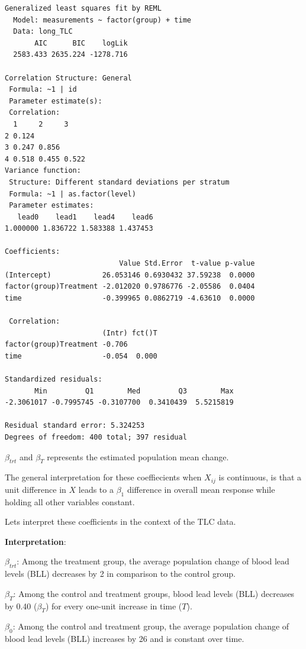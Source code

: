\documentclass[
  letterpaper,
  DIV=11,
  numbers=noendperiod]{scrreprt}
\begin{document}
\begin{verbatim}
Generalized least squares fit by REML
  Model: measurements ~ factor(group) + time 
  Data: long_TLC 
       AIC      BIC    logLik
  2583.433 2635.224 -1278.716

Correlation Structure: General
 Formula: ~1 | id 
 Parameter estimate(s):
 Correlation: 
  1     2     3    
2 0.124            
3 0.247 0.856      
4 0.518 0.455 0.522
Variance function:
 Structure: Different standard deviations per stratum
 Formula: ~1 | as.factor(level) 
 Parameter estimates:
   lead0    lead1    lead4    lead6 
1.000000 1.836722 1.583388 1.437453 

Coefficients:
                           Value Std.Error  t-value p-value
(Intercept)            26.053146 0.6930432 37.59238  0.0000
factor(group)Treatment -2.012020 0.9786776 -2.05586  0.0404
time                   -0.399965 0.0862719 -4.63610  0.0000

 Correlation: 
                       (Intr) fct()T
factor(group)Treatment -0.706       
time                   -0.054  0.000

Standardized residuals:
       Min         Q1        Med         Q3        Max 
-2.3061017 -0.7995745 -0.3107700  0.3410439  5.5215819 

Residual standard error: 5.324253 
Degrees of freedom: 400 total; 397 residual
\end{verbatim}

\(\beta_{trt}\) and \(\beta_{T}\) represents the estimated population
mean change.

The general interpretation for these coeffiecients when \(X_{ij}\) is
continuous, is that a unit difference in \(X\) leads to a \(\beta_1\)
difference in overall mean response while holding all other variables
constant.

Lets interpret these coefficients in the context of the TLC data.

\textbf{Interpretation}:

\(\beta_{trt}\): Among the treatment group, the average population
change of blood lead levels (BLL) decreases by 2 in comparison to the
control group.

\(\beta_{T}\): Among the control and treatment groups, blood lead levels
(BLL) decreases by 0.40 (\(\beta_{T}\)) for every one-unit increase in
time (\(T\)).

\(\beta_{0}\): Among the control and treatment group, the average
population change of blood lead levels (BLL) increases by 26 and is
constant over time.
\end{document}
